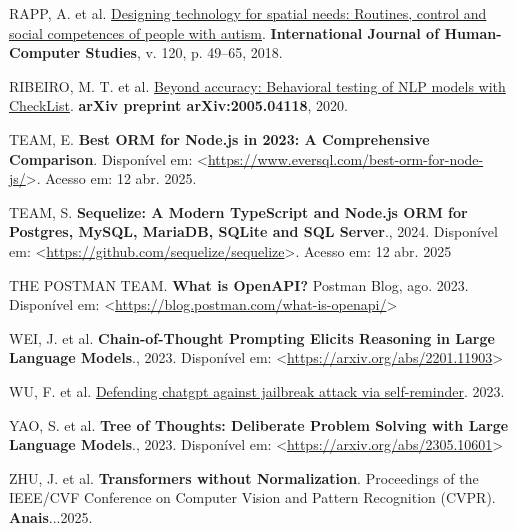 \documentclass[
]{article}
\newlength{\cslhangindent}
\newenvironment{CSLReferences}[2] %
 {\begin{list}{}{%
  \setlength{\itemindent}{0pt}
  \setlength{\leftmargin}{0pt}
  \setlength{\parsep}{0pt}
  \ifodd #1
   \setlength{\leftmargin}{\cslhangindent}
   \setlength{\itemindent}{-1\cslhangindent}
  \fi
  \setlength{\itemsep}{#2\baselineskip}}}
 {\end{list}}
\begin{document}
\begin{CSLReferences}{0}{1}
RAPP, A. et al.
\href{https://doi.org/10.1016/j.ijhcs.2018.07.005}{Designing technology
for spatial needs: Routines, control and social competences of people
with autism}. \textbf{International Journal of Human-Computer Studies},
v. 120, p. 49--65, 2018.

RIBEIRO, M. T. et al. \href{https://arxiv.org/abs/2005.04118}{Beyond
accuracy: Behavioral testing of NLP models with CheckList}.
\textbf{arXiv preprint arXiv:2005.04118}, 2020.

TEAM, E. \textbf{Best ORM for Node.js in 2023: A Comprehensive
Comparison}. Disponível em:
\textless{}\url{https://www.eversql.com/best-orm-for-node-js/}\textgreater.
Acesso em: 12 abr. 2025.

TEAM, S. \textbf{Sequelize: A Modern TypeScript and Node.js ORM for
Postgres, MySQL, MariaDB, SQLite and SQL Server}., 2024. Disponível em:
\textless{}\url{https://github.com/sequelize/sequelize}\textgreater.
Acesso em: 12 abr. 2025

THE POSTMAN TEAM. \textbf{{What is OpenAPI?}} Postman Blog, ago. 2023.
Disponível em:
\textless{}\url{https://blog.postman.com/what-is-openapi/}\textgreater{}

WEI, J. et al. \textbf{Chain-of-Thought Prompting Elicits Reasoning in
Large Language Models}., 2023. Disponível em:
\textless{}\url{https://arxiv.org/abs/2201.11903}\textgreater{}

WU, F. et al.
\href{https://www.researchsquare.com/article/rs-2873090/v1}{Defending
chatgpt against jailbreak attack via self-reminder}. 2023.

YAO, S. et al. \textbf{Tree of Thoughts: Deliberate Problem Solving with
Large Language Models}., 2023. Disponível em:
\textless{}\url{https://arxiv.org/abs/2305.10601}\textgreater{}

ZHU, J. et al. \textbf{Transformers without Normalization}. Proceedings
of the IEEE/CVF Conference on Computer Vision and Pattern Recognition
(CVPR). \textbf{Anais}...2025.

\end{CSLReferences}
\end{document}
